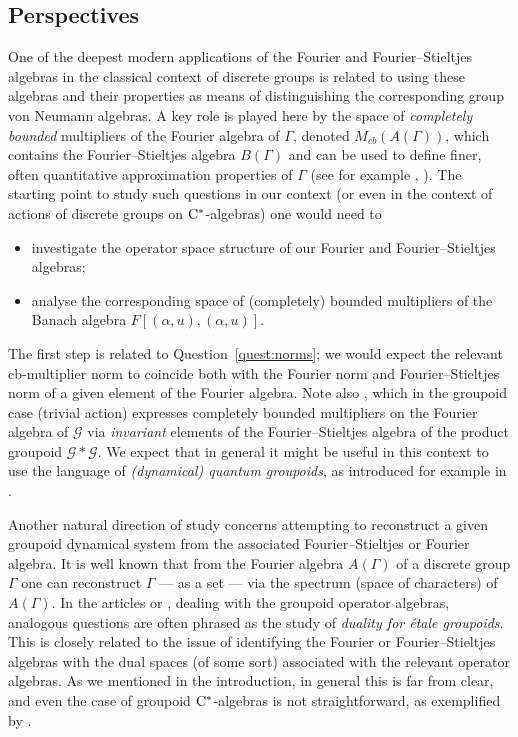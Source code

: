 \documentclass[11 pt, leqno]{amsart}
\numberwithin{equation}{section}
\theoremstyle{plain}
\theoremstyle{definition}
\renewcommand{\star}{*}
\newcommand{\G}{\mathcal G} %
\newcommand{\cst}{\ifmmode\mathrm{C}^*\else{$\mathrm{C}^*$}\fi}
\begin{document}
\vspace*{0.2 cm}

%
\subsection*{Perspectives}

One of the deepest modern applications of the Fourier and Fourier--Stieltjes algebras in the classical context of discrete groups is related to using these algebras and their properties as means of distinguishing the corresponding group von Neumann algebras. 
A key role is played here by the space of \emph{completely bounded} multipliers of the Fourier algebra of $\Gamma$, denoted $M_{cb}(A(\Gamma))$, which contains the Fourier--Stieltjes algebra $B(\Gamma)$ and can be used to define finer, often quantitative approximation properties of $\Gamma$ (see for example \cite{ch}, \cite{hk}). 
The starting point to study such questions in our context (or even in the context of actions of discrete groups on $\cst$-algebras) one would need to 
\begin{itemize}
    \item investigate the operator space structure of our Fourier and Fourier--Stieltjes algebras;
    \item analyse the corresponding space of (completely) bounded multipliers of the Banach algebra $F[(\alpha,u),(\alpha,u)]$. 
\end{itemize}
The first step is related to Question~\ref{quest:norms}; we would expect the relevant cb-multiplier norm to coincide both with the Fourier norm and Fourier--Stieltjes norm of a given element of the Fourier algebra. 
Note also \cite[Theorem 3.1]{Renault}, which in the groupoid case (trivial action) expresses completely bounded multipliers on the Fourier algebra of $\G$ via \emph{invariant} elements of the Fourier--Stieltjes algebra of the product groupoid $\G \star \G$. 
We expect that in general it might be useful in this context to use the language of \emph{(dynamical) quantum groupoids}, as introduced for example in \cite{EnockTim}.

\vspace*{0.2 cm}

Another natural direction of study concerns attempting to reconstruct a given groupoid dynamical system from the associated Fourier--Stieltjes or Fourier algebra. 
It is well known that from the Fourier algebra $A(\Gamma)$ of a discrete group $\Gamma$ one can reconstruct $\Gamma$ --- as a set --- via the spectrum (space of characters) of $A(\Gamma)$. 
In the articles \cite{RenaultFourier} or \cite{RamsayWalter}, dealing with the groupoid operator algebras, analogous questions are often phrased as the study of \emph{duality for \'etale groupoids}. 
This is closely related to the issue of identifying the Fourier or Fourier--Stieltjes algebras with the dual spaces (of some sort) associated with the relevant operator algebras. 
As we mentioned in the introduction, in general this is far from clear, and even the case of groupoid $\cst$-algebras is not straightforward, as exemplified by \cite[Theorem 2.3]{Renault}.
\end{document}

